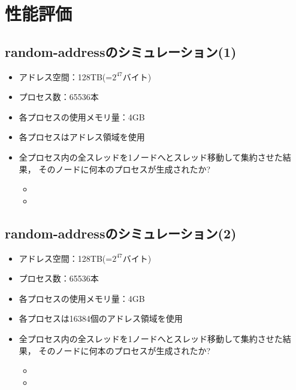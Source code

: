 \documentclass[25pt,papersize,landscape]{jsarticle}
\begin{document}
\section{性能評価}

\subsection{random-addressのシミュレーション(1)}

\begin{itemize}
\item アドレス空間：128TB(=$2^{47}$バイト)
\item プロセス数：65536本
\item 各プロセスの使用メモリ量：4GB
\item 各プロセスはアドレス領域を使用
\item 全プロセス内の全スレッドを1ノードへとスレッド移動して集約させた結果，
  そのノードに何本のプロセスが生成されたか?
  \begin{itemize}
  \item {}
  \item {}
  \end{itemize}
\end{itemize}

\subsection{random-addressのシミュレーション(2)}

\begin{itemize}
\item アドレス空間：128TB(=$2^{47}$バイト)
\item プロセス数：65536本
\item 各プロセスの使用メモリ量：4GB
\item 各プロセスは16384個のアドレス領域を使用
\item 全プロセス内の全スレッドを1ノードへとスレッド移動して集約させた結果，
  そのノードに何本のプロセスが生成されたか?
  \begin{itemize}
  \item {}
  \item {}
  \end{itemize}
\end{itemize}
\end{document}

